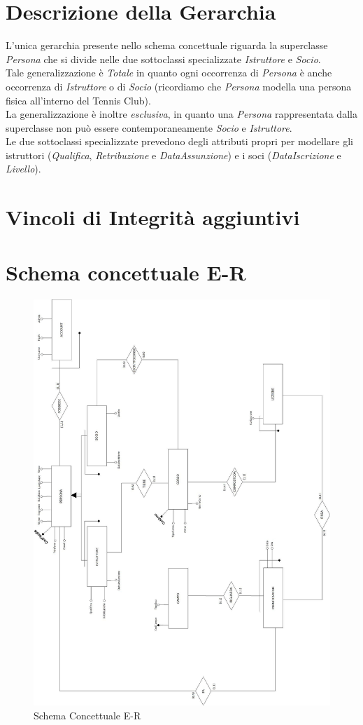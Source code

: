 \section{Descrizione della Gerarchia}
L'unica gerarchia presente nello schema concettuale riguarda la superclasse \textit{Persona} che si divide nelle due sottoclassi specializzate \textit{Istruttore} e \textit{Socio}.\\

Tale generalizzazione è \textit{Totale} in quanto ogni occorrenza di \textit{Persona} è anche occorrenza di \textit{Istruttore} o di \textit{Socio} (ricordiamo che \textit{Persona} modella una persona fisica all'interno del Tennis Club).\\
La generalizzazione è inoltre \textit{esclusiva}, in quanto una \textit{Persona} rappresentata dalla superclasse non può essere contemporaneamente \textit{Socio} e \textit{Istruttore}.\\

Le due sottoclassi specializzate prevedono degli attributi propri per modellare gli istruttori (\textit{Qualifica}, \textit{Retribuzione} e \textit{DataAssunzione}) e i soci (\textit{DataIscrizione} e \textit{Livello}).

\section{Vincoli di Integrità aggiuntivi}

\section{Schema concettuale E-R}
\begin{figure}[H]
 \centering
  \includegraphics[width=\textwidth, height=\textheight]{Images/ER_FINALE.jpg}
\caption{Schema Concettuale E-R}
\end{figure}